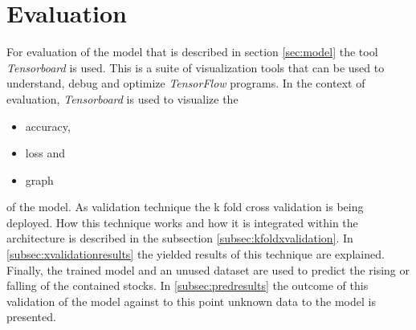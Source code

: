 \section{Evaluation}
\label{sec:evaluation}
For evaluation of the model that is described in section \ref{sec:model} the tool \textit{Tensorboard} is used. This is a suite of visualization tools that can be used to understand, debug and optimize \textit{TensorFlow} programs. In the context of evaluation, \textit{Tensorboard} is used to visualize the 
\begin{itemize}
	\item accuracy,
	\item loss and
	\item graph
\end{itemize}
of the model. As validation technique the k fold cross validation is being deployed. How this technique works and how it is integrated within the architecture is described in the subsection \ref{subsec:kfoldxvalidation}. In \ref{subsec:xvalidationresults} the yielded results of this technique are explained. Finally, the trained model and an unused dataset are used to predict the rising or falling of the contained stocks. In \ref{subsec:predresults} the outcome of this validation of the model against to this point unknown data to the model is presented. 

